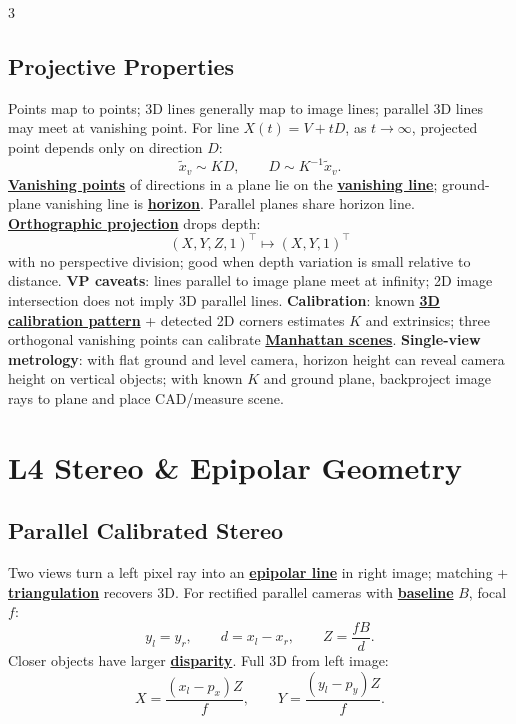\documentclass{article}
\numberwithin{equation}{subsection}
\newcommand{\key}[1]{\textbf{#1}}
\newcommand{\lowterm}[1]{\textbf{\underline{#1}}}
\begin{document}
\begin{multicols*}{3}
\subsection{Projective Properties}
Points map to points; 3D lines generally map to image lines; parallel 3D lines may meet at vanishing point. For line $X(t)=V+tD$, as $t\to\infty$, projected point depends only on direction $D$:
\[
\tilde x_v\sim KD,\qquad D\sim K^{-1}\tilde x_v .
\]
\lowterm{Vanishing points} of directions in a plane lie on the \lowterm{vanishing line}; ground-plane vanishing line is \lowterm{horizon}. Parallel planes share horizon line. \lowterm{Orthographic projection} drops depth:
\[
(X,Y,Z,1)^\top\mapsto(X,Y,1)^\top
\]
with no perspective division; good when depth variation is small relative to distance.
\key{VP caveats}: lines parallel to image plane meet at infinity; 2D image intersection does not imply 3D parallel lines. \key{Calibration}: known \lowterm{3D calibration pattern} + detected 2D corners estimates $K$ and extrinsics; three orthogonal vanishing points can calibrate \lowterm{Manhattan scenes}. \key{Single-view metrology}: with flat ground and level camera, horizon height can reveal camera height on vertical objects; with known $K$ and ground plane, backproject image rays to plane and place CAD/measure scene.

\section{L4 Stereo \& Epipolar Geometry}
\subsection{Parallel Calibrated Stereo}
Two views turn a left pixel ray into an \lowterm{epipolar line} in right image; matching + \lowterm{triangulation} recovers 3D. For rectified parallel cameras with \lowterm{baseline} $B$, focal $f$:
\[
y_l=y_r,\qquad d=x_l-x_r,\qquad Z=\frac{fB}{d}.
\]
Closer objects have larger \lowterm{disparity}. Full 3D from left image:
\[
X=\frac{(x_l-p_x)Z}{f},\qquad Y=\frac{(y_l-p_y)Z}{f}.
\]



\end{multicols*}
\end{document}
